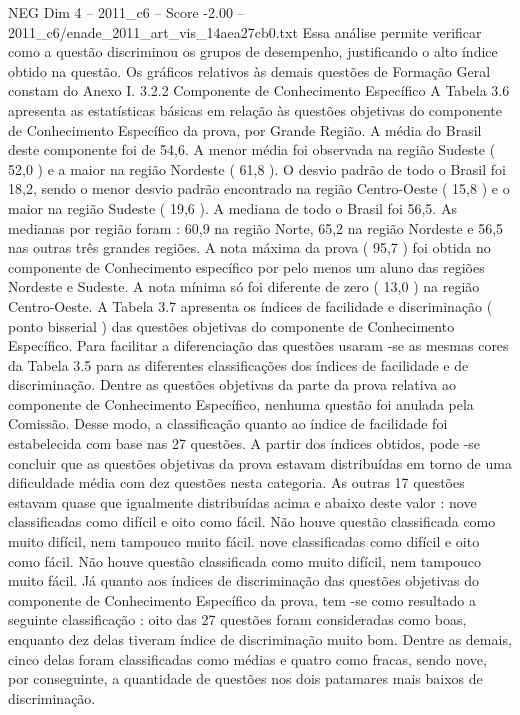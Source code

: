 \begin{textsample}{NEG Dim 4 – 2011\_c6 – Score -2.00 – 2011\_c6/enade\_2011\_art\_vis\_14aea27cb0.txt}
Essa análise permite verificar como a questão discriminou os grupos de desempenho, justificando o alto índice obtido na questão.
Os gráficos relativos às demais questões de Formação Geral constam do Anexo I. 3.2.2 Componente de Conhecimento Específico A Tabela 3.6 apresenta as estatísticas básicas em relação às questões objetivas do componente de Conhecimento Específico da prova, por Grande Região.
A média do Brasil deste componente foi de 54,6.
A menor média foi observada na região Sudeste ( 52,0 ) e a maior na região Nordeste ( 61,8 ).
O desvio padrão de todo o Brasil foi 18,2, sendo o menor desvio padrão encontrado na região Centro-Oeste ( 15,8 ) e o maior na região Sudeste ( 19,6 ).
A mediana de todo o Brasil foi 56,5.
As medianas por região foram : 60,9 na região Norte, 65,2 na região Nordeste e 56,5 nas outras três grandes regiões.
A nota máxima da prova ( 95,7 ) foi obtida no componente de Conhecimento específico por pelo menos um aluno das regiões Nordeste e Sudeste.
A nota mínima só foi diferente de zero ( 13,0 ) na região Centro-Oeste.
A Tabela 3.7 apresenta os índices de facilidade e discriminação ( ponto bisserial ) das questões objetivas do componente de Conhecimento Específico.
Para facilitar a diferenciação das questões usaram -se as mesmas cores da Tabela 3.5 para as diferentes classificações dos índices de facilidade e de discriminação.
Dentre as questões objetivas da parte da prova relativa ao componente de Conhecimento Específico, nenhuma questão foi anulada pela Comissão.
Desse modo, a classificação quanto ao índice de facilidade foi estabelecida com base nas 27 questões.
A partir dos índices obtidos, pode -se concluir que as questões objetivas da prova estavam distribuídas em torno de uma dificuldade média com dez questões nesta categoria.
As outras 17 questões estavam quase que igualmente distribuídas acima e abaixo deste valor : nove classificadas como difícil e oito como fácil.
Não houve questão classificada como muito difícil, nem tampouco muito fácil. nove classificadas como difícil e oito como fácil.
Não houve questão classificada como muito difícil, nem tampouco muito fácil.
Já quanto aos índices de discriminação das questões objetivas do componente de Conhecimento Específico da prova, tem -se como resultado a seguinte classificação : oito das 27 questões foram consideradas como boas, enquanto dez delas tiveram índice de discriminação muito bom.
Dentre as demais, cinco delas foram classificadas como médias e quatro como fracas, sendo nove, por conseguinte, a quantidade de questões nos dois patamares mais baixos de discriminação.

\end{textsample}
